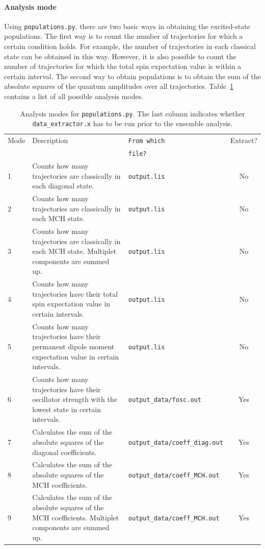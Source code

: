 \documentclass[a4paper,11pt,DIV=15,openany,twoside=false]{scrbook}
\newcommand{\ttt}[1]{\texttt{#1}}
\begin{document}
\paragraph{Analysis mode}

Using \ttt{populations.py}, there are two basic ways in obtaining the excited-state populations. The first way is to count the number of trajectories for which a certain condition holds. For example, the number of trajectories in each classical state can be obtained in this way. However, it is also possible to count the number of trajectories for which the total spin expectation value is within a certain interval. 
The second way to obtain populations is to obtain the sum of the absolute squares of the quantum amplitudes over all trajectories. Table~\ref{tab:Populations_modes} contains a list of all possible analysis modes.

\begin{table}
  \centering
  \caption{Analysis modes for \ttt{populations.py}. The last column indicates whether \ttt{data\_extractor.x} has to be run prior to the ensemble analysis.}
  \label{tab:Populations_modes}
  \begin{tabular}{lp{6cm}>{\tt}lc}
    \toprule
    Mode        &Description    &\rmfamily From which     &Extract?\\
                               &&\rmfamily file?          &\\
    \midrule
    1   &Counts how many trajectories are classically in each diagonal state. &output.lis  &No\\
    2   &Counts how many trajectories are classically in each MCH state. &output.lis  &No\\
    3   &Counts how many trajectories are classically in each MCH state. Multiplet components are summed up. &output.lis  &No\\
    4   &Counts how many trajectories have their total spin expectation value in certain intervals.   &output.lis &No\\
    5   &Counts how many trajectories have their permanent dipole moment expectation value in certain intervals.   &output.lis &No\\
    6   &Counts how many trajectories have their oscillator strength with the lowest state in certain intervals.        &output\_data/fosc.out  &Yes\\
    7   &Calculates the sum of the absolute squares of the diagonal coefficients.       &output\_data/coeff\_diag.out&Yes\\
    8   &Calculates the sum of the absolute squares of the MCH coefficients.       &output\_data/coeff\_MCH.out&Yes\\
    9   &Calculates the sum of the absolute squares of the MCH coefficients. Multiplet components are summed up.       &output\_data/coeff\_MCH.out&Yes\\
    \bottomrule
  \end{tabular}
\end{table}
\end{document}

